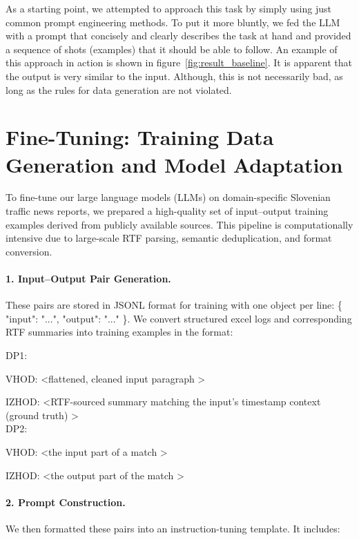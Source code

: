 \documentclass[fleqn,moreauthors,10pt]{ds_report}
\begin{document}

As a starting point, we attempted to approach this task by simply using just common prompt engineering methods.
To put it more bluntly, we fed the LLM with a prompt that concisely and clearly describes the task at hand and provided a sequence of shots (examples) that it should be able to follow.
An example of this approach in action is shown in figure~\ref{fig:result_baseline}.
It is apparent that the output is very similar to the input.
Although, this is not necessarily bad, as long as the rules for data generation are not violated.


\section*{Fine-Tuning: Training Data Generation and Model Adaptation}
To fine-tune our large language models (LLMs) on domain-specific Slovenian traffic news reports, we prepared a high-quality set of input–output training examples derived from publicly available sources. This pipeline is computationally intensive due to large-scale RTF parsing, semantic deduplication, and format conversion.

\paragraph{1. Input–Output Pair Generation.}
These pairs are stored in JSONL format for training with one object per line:
\{ "input": "...", "output": "..." \}.
We convert structured excel logs and corresponding RTF summaries into training examples in the format:

DP1:

VHOD:
\textless flattened, cleaned input paragraph \textgreater

IZHOD:
\textless RTF-sourced summary matching the input's timestamp context (ground truth) \textgreater
\\

DP2:

VHOD:
\textless the input part of a match \textgreater

IZHOD:
\textless the output part of the match \textgreater

\paragraph{2. Prompt Construction.}
We then formatted these pairs into an instruction-tuning template. It includes:
\end{document}
